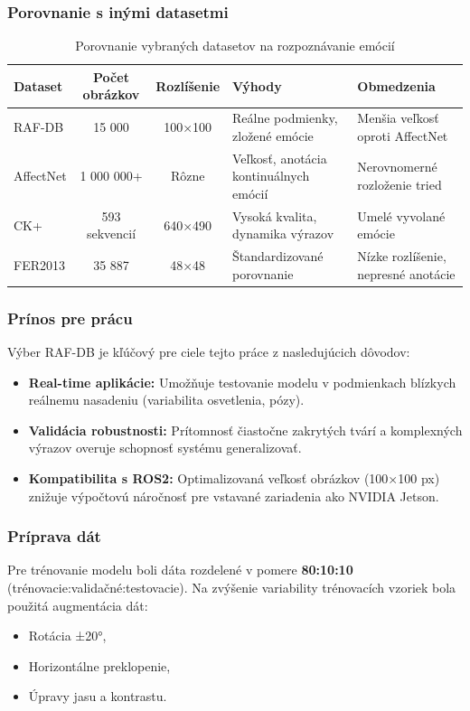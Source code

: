 \subsubsection{Porovnanie s inými datasetmi}

\begin{table}[H]
    \centering
    \begin{tabularx}{\textwidth}{|l|c|c|X|X|}
        \hline
        \textbf{Dataset} & \textbf{Počet obrázkov} & \textbf{Rozlíšenie} & \textbf{Výhody} & \textbf{Obmedzenia} \\ \hline
        RAF-DB          & 15 000                  & 100×100            & Reálne podmienky, zložené emócie    & Menšia veľkosť oproti AffectNet \\ \hline
        AffectNet       & 1 000 000+              & Rôzne              & Veľkosť, anotácia kontinuálnych emócií & Nerovnomerné rozloženie tried \\ \hline
        CK+             & 593 sekvencií           & 640×490            & Vysoká kvalita, dynamika výrazov    & Umelé vyvolané emócie \\ \hline
        FER2013         & 35 887                  & 48×48              & Štandardizované porovnanie          & Nízke rozlíšenie, nepresné anotácie \\ \hline
    \end{tabularx}
    \caption{Porovnanie vybraných datasetov na rozpoznávanie emócií}
\end{table}
\subsubsection{Prínos pre prácu}
Výber RAF-DB je kľúčový pre ciele tejto práce z nasledujúcich dôvodov:
\begin{itemize}
    \item \textbf{Real-time aplikácie:} Umožňuje testovanie modelu v podmienkach blízkych reálnemu nasadeniu (variabilita osvetlenia, pózy).
    \item \textbf{Validácia robustnosti:} Prítomnosť čiastočne zakrytých tvárí a komplexných výrazov overuje schopnosť systému generalizovať.
    \item \textbf{Kompatibilita s ROS2:} Optimalizovaná veľkosť obrázkov (100×100 px) znižuje výpočtovú náročnosť pre vstavané zariadenia ako NVIDIA Jetson.
\end{itemize}

\subsubsection{Príprava dát}
Pre trénovanie modelu boli dáta rozdelené v pomere \textbf{80:10:10} (trénovacie:validačné:testovacie). Na zvýšenie variability trénovacích vzoriek bola použitá augmentácia dát:
\begin{itemize}
    \item Rotácia ±20°,
    \item Horizontálne preklopenie,
    \item Úpravy jasu a kontrastu.
\end{itemize}

